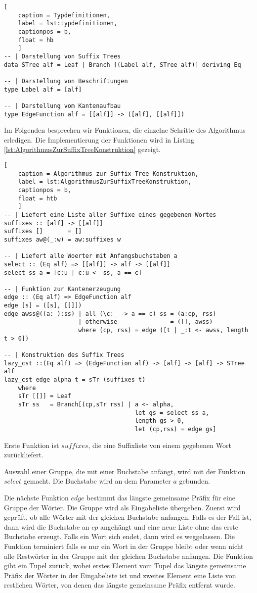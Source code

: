 \documentclass[12pt]{report}
\begin{document}
\begin{lstlisting}[
    caption = Typdefinitionen,
    label = lst:typdefinitionen,
    captionpos = b,
    float = hb
    ]
-- | Darstellung von Suffix Trees
data STree alf = Leaf | Branch [(Label alf, STree alf)] deriving Eq

-- | Darstellung von Beschriftungen
type Label alf = [alf]

-- | Darstellung vom Kantenaufbau
type EdgeFunction alf = [[alf]] -> ([alf], [[alf]])
\end{lstlisting}

Im Folgenden besprechen wir Funktionen, die einzelne Schritte des Algorithmus erledigen. Die Implementierung der Funktionen wird in Listing \ref{lst:AlgorithmusZurSuffixTreeKonstruktion} gezeigt.

\begin{lstlisting}[
    caption = Algorithmus zur Suffix Tree Konstruktion,
    label = lst:AlgorithmusZurSuffixTreeKonstruktion,
    captionpos = b,
    float = htb
    ]
-- | Liefert eine Liste aller Suffixe eines gegebenen Wortes
suffixes :: [alf] -> [[alf]]
suffixes []       = []
suffixes aw@(_:w) = aw:suffixes w

-- | Liefert alle Woerter mit Anfangsbuchstaben a
select :: (Eq alf) => [[alf]] -> alf -> [[alf]]
select ss a = [c:u | c:u <- ss, a == c]

-- | Funktion zur Kantenerzeugung
edge :: (Eq alf) => EdgeFunction alf
edge [s] = ([s], [[]])
edge awss@((a:_):ss) | all (\c:_ -> a == c) ss = (a:cp, rss)
                     | otherwise               = ([], awss)
                     where (cp, rss) = edge ([t | _:t <- awss, length t > 0])

-- | Konstruktion des Suffix Trees
lazy_cst ::(Eq alf) => (EdgeFunction alf) -> [alf] -> [alf] -> STree alf
lazy_cst edge alpha t = sTr (suffixes t)
    where
    sTr [[]] = Leaf
    sTr ss   = Branch[(cp,sTr rss) | a <- alpha,
                                     let gs = select ss a,
                                     length gs > 0,
                                     let (cp,rss) = edge gs]
\end{lstlisting}

Erste Funktion ist $suffixes$, die eine Suffixliste von einem gegebenen Wort zurückliefert.

Auswahl einer Gruppe, die mit einer Buchstabe anfängt, wird mit der Funktion $select$ gemacht. Die Buchstabe wird an dem Parameter $a$ gebunden.

Die nächste Funktion $edge$ bestimmt das längste gemeinsame Präfix für eine Gruppe der Wörter. Die Gruppe wird als Eingabeliste übergeben. Zuerst wird geprüft, ob alle Wörter mit der gleichen Buchstabe anfangen. Falls es der Fall ist, dann wird die Buchstabe an $cp$ angehängt und eine neue Liste ohne das erste Buchstabe erzeugt. Falls ein Wort sich endet, dann wird es weggelassen. Die Funktion terminiert falls es nur ein Wort in der Gruppe bleibt oder wenn nicht alle Restwörter in der Gruppe mit der gleichen Buchstabe anfangen. Die Funktion gibt ein Tupel zurück, wobei erstes Element vom Tupel das längste gemeinsame Präfix der Wörter in der Eingabeliste ist und zweites Element eine Liste von restlichen Wörter, von denen das längste gemeinsame Präfix entfernt wurde.
\end{document}
